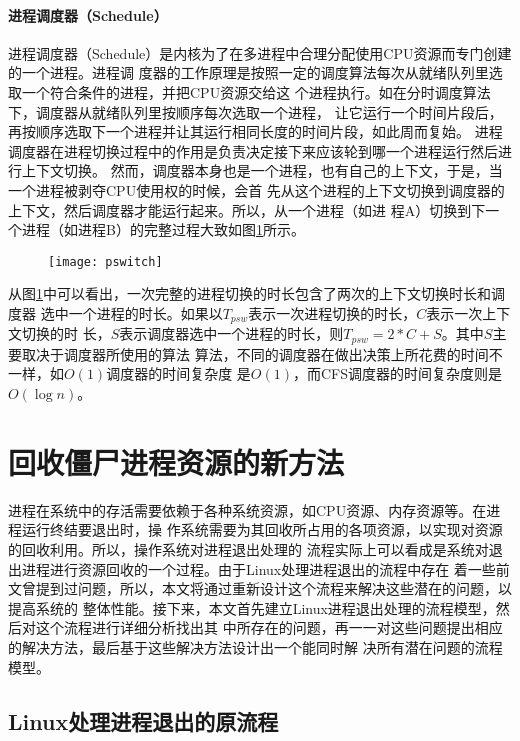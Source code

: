 \documentclass{swfuthesism}
\begin{document}
\subsubsection{进程调度器（Schedule）}

进程调度器（Schedule）是内核为了在多进程中合理分配使用CPU资源而专门创建的一个进程。进程调
度器的工作原理是按照一定的调度算法每次从就绪队列里选取一个符合条件的进程，并把CPU资源交给这
个进程执行\cite{rusling99tlk}。如在分时调度算法下，调度器从就绪队列里按顺序每次选取一个进程，
让它运行一个时间片段后，再按顺序选取下一个进程并让其运行相同长度的时间片段，如此周而复始。
进程调度器在进程切换过程中的作用是负责决定接下来应该轮到哪一个进程运行然后进行上下文切换。
然而，调度器本身也是一个进程，也有自己的上下文，于是，当一个进程被剥夺CPU使用权的时候，会首
先从这个进程的上下文切换到调度器的上下文，然后调度器才能运行起来。所以，从一个进程（如进
程A）切换到下一个进程（如进程B）的完整过程大致如图\ref{fig:sched5}所示。

\begin{figure}%
  \centering
  \texttt{[image: pswitch]}
  \label{fig:sched5}
\end{figure}

从图\ref{fig:sched5}中可以看出，一次完整的进程切换的时长包含了两次的上下文切换时长和调度器
选中一个进程的时长。如果以$T_{psw}$表示一次进程切换的时长，$C$表示一次上下文切换的时
长，$S$表示调度器选中一个进程的时长，则$T_{psw}=2*C+S$。其中$S$主要取决于调度器所使用的算法
算法，不同的调度器在做出决策上所花费的时间不一样，如$O(1)$调度器的时间复杂度
是$O(1)$\cite{wiki:o1s}，而CFS调度器的时间复杂度则是$O(\log n)$\cite{wiki:cfs}。

\chapter{回收僵尸进程资源的新方法}

进程在系统中的存活需要依赖于各种系统资源，如CPU资源、内存资源等。在进程运行终结要退出时，操
作系统需要为其回收所占用的各项资源，以实现对资源的回收利用。所以，操作系统对进程退出处理的
流程实际上可以看成是系统对退出进程进行资源回收的一个过程。由于Linux处理进程退出的流程中存在
着一些前文曾提到过问题，所以，本文将通过重新设计这个流程来解决这些潜在的问题，以提高系统的
整体性能。接下来，本文首先建立Linux进程退出处理的流程模型，然后对这个流程进行详细分析找出其
中所存在的问题，再一一对这些问题提出相应的解决方法，最后基于这些解决方法设计出一个能同时解
决所有潜在问题的流程模型。

\section{Linux处理进程退出的原流程}
\label{sec:workflow}
\end{document}
